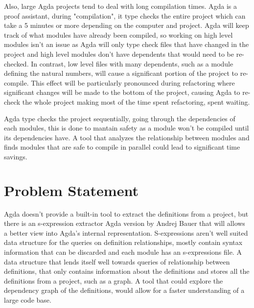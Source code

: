 Also, large Agda projects tend to deal with long compilation times. Agda is a
proof assistant, during "compilation", it type checks the entire project which
can take a 5 minutes or more depending on the computer and project. Agda will
keep track of what modules have already been compiled, so working on high level
modules isn't an issue as Agda will only type check files that have changed in
the project and high level modules don't have dependents that would need to be
re-checked. In contrast, low level files with many dependents, such as a module
defining the natural numbers, will cause a significant portion of the project
to re-compile. This effect will be particularly pronounced during refactoring
where significant changes will be made to the bottom of the project, causing
Agda to re-check the whole project making most of the time spent refactoring,
spent waiting. 

Agda type checks the project sequentially, going through the dependencies of
each modules, this is done to mantain safety as a module won't be compiled
until its dependencies have. A tool that analyzes the relationship between
modules and finds modules that are safe to compile in parallel could lead to
significant time savings.




\section{Problem Statement}

Agda doesn't provide a built-in tool to extract the definitions from a project,
but there is an s-expression extractor Agda version by Andrej Bauer
\cite{andrej} that will allows a better view into Agda's internal
representation. S-expressions aren't well suited data structure for the queries
on definition relationships, mostly contain syntax information that can be
discarded and each module has an s-expressions file. A data structure that
lends itself well towards queries of relationship between definitions, that
only contains information about the definitions and stores all the definitions
from a project, such as a graph. A tool that could explore the dependency graph
of the definitions, would allow for a faster understanding of a large code
base.

